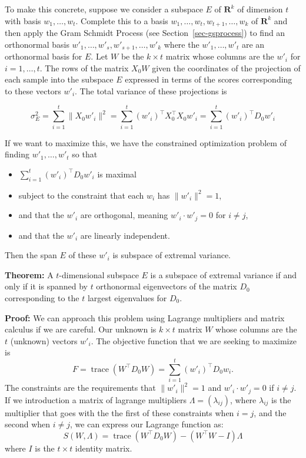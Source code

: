 \documentclass[
  11pt,
  letterpaper,
]{scrbook}
\providecommand{\tightlist}{%
  \setlength{\itemsep}{0pt}\setlength{\parskip}{0pt}}\usepackage{longtable,booktabs,array}
\theoremstyle{plain}
\theoremstyle{plain}
\theoremstyle{remark}
\begin{document}
To make this concrete, suppose we consider a subspace \(E\) of
\(\mathbf{R}^{k}\) of dimension \(t\) with basis
\(w_{1},\ldots, w_{t}\). Complete this to a basis
\(w_{1},\ldots, w_{t},w_{t+1},\ldots, w_{k}\) of \(\mathbf{R}^{k}\) and
then apply the Gram Schmidt Process (see Section~\ref{sec-gsprocess}) to
find an orthonormal basis
\(w'_{1},\ldots,w'_{s},w'_{s+1},\ldots, w'_{k}\) where the
\(w'_{1},\ldots, w'_{t}\) are an orthonormal basis for \(E\). Let \(W\)
be the \(k\times t\) matrix whose columns are the \(w'_{i}\) for
\(i=1,\ldots,t\). The rows of the matrix \(X_{0}W\) given the
coordinates of the projection of each sample into the subspace \(E\)
expressed in terms of the scores corresponding to these vectors
\(w'_{i}\). The total variance of these projections is

\[
\sigma_{E}^2 = \sum_{i=1}^{t} \|X_{0}w'_{i}\|^2 = \sum_{i=1}^{t} (w'_{i})^{\intercal}X_{0}^{\intercal}X_{0}w'_{i}  = \sum_{i=1}^{t} (w'_{i})^{\intercal}D_{0}w'_{i}
\]

If we want to maximize this, we have the constrained optimization
problem of finding \(w'_{1},\ldots, w'_{t}\) so that

\begin{itemize}
\tightlist
\item
  \(\sum_{i=1}^{t} (w'_{i})^{\intercal}D_{0}w'_{i}\) is maximal
\item
  subject to the constraint that each \(w_{i}\) has \(\|w'_{i}\|^2=1\),
\item
  and that the \(w'_{i}\) are orthogonal, meaning
  \(w'_{i}\cdot w'_{j}=0\) for \(i\not=j\),
\item
  and that the \(w'_{i}\) are linearly independent.
\end{itemize}

Then the span \(E\) of these \(w'_{i}\) is subspace of extremal
variance.

\textbf{Theorem:} A \(t\)-dimensional subspace \(E\) is a subspace of
extremal variance if and only if it is spanned by \(t\) orthonormal
eigenvectors of the matrix \(D_{0}\) corresponding to the \(t\) largest
eigenvalues for \(D_{0}\).

\textbf{Proof:} We can approach this problem using Lagrange multipliers
and matrix calculus if we are careful. Our unknown is \(k\times t\)
matrix \(W\) whose columns are the \(t\) (unknown) vectors \(w'_{i}\).
The objective function that we are seeking to maximize is \[
F = \mathop{trace}(W^{\intercal}D_{0}W) = \sum_{i=1}^{t} (w'_{i})^{\intercal}D_{0}w_{i}.
\] The constraints are the requirements that \(\|w'_{i}\|^2=1\) and
\(w'_{i}\cdot w'_{j}=0\) if \(i\not=j\). If we introduction a matrix of
lagrange multipliers \(\Lambda=(\lambda_{ij})\), where \(\lambda_{ij}\)
is the multiplier that goes with the the first of these constraints when
\(i=j\), and the second when \(i\not=j\), we can express our Lagrange
function as: \[
S(W,\Lambda) = \mathop{trace}(W^{\intercal}D_{0}W) - (W^{\intercal}W-I)\Lambda
\] where \(I\) is the \(t\times t\) identity matrix.
\end{document}
